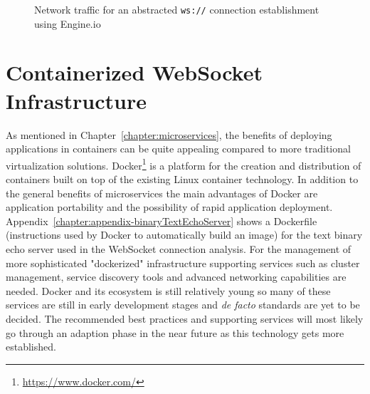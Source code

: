 \begin{figure}[h!]
	\centering
	\caption{Network traffic for an abstracted \texttt{ws://} connection establishment using Engine.io}
	\label{fig:engineioTraffic}
\end{figure}

\section{Containerized WebSocket Infrastructure}

As mentioned in Chapter~\ref{chapter:microservices}, the benefits of deploying applications in containers can be quite appealing compared to more traditional virtualization solutions. Docker\footnote{\url{https://www.docker.com/}} is a platform for the creation and distribution of containers built on top of the existing Linux container technology. In addition to the general benefits of microservices the main advantages of Docker are application portability and the possibility of rapid application deployment. Appendix~\ref{chapter:appendix-binaryTextEchoServer} shows a Dockerfile (instructions used by Docker to automatically build an image) for the text binary echo server used in the WebSocket connection analysis. For the management of more sophisticated "dockerized" infrastructure supporting services such as cluster management, service discovery tools and advanced networking capabilities are needed. Docker and its ecosystem is still relatively young so many of these services are still in early development stages and \textit{de facto} standards are yet to be decided. The recommended best practices and supporting services will most likely go through an adaption phase in the near future as this technology gets more established.



